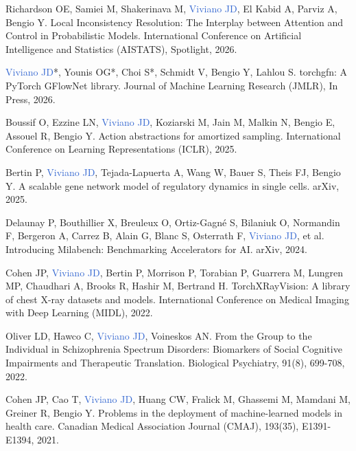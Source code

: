 \documentclass[a4paper,11pt,oneside]{book}
\newcommand\paper[1]{
    #1\\
    \vspace{3.5mm}
}
\begin{document}
\begin{flushleft}
\paper{Richardson OE, Samiei M, Shakerinava M, \textcolor{highlight}{Viviano JD}, El Kabid A, Parviz A, Bengio Y. Local Inconsistency Resolution: The Interplay between Attention and Control in Probabilistic Models. International Conference on Artificial Intelligence and Statistics (AISTATS), Spotlight, 2026.}

\paper{\textcolor{highlight}{Viviano JD}*, Younis OG*, Choi S*, Schmidt V, Bengio Y, Lahlou S. torchgfn: A PyTorch GFlowNet library. Journal of Machine Learning Research (JMLR), In Press, 2026.}

\paper{Boussif O, Ezzine LN, \textcolor{highlight}{Viviano JD}, Koziarski M, Jain M, Malkin N, Bengio E, Assouel R, Bengio Y. Action abstractions for amortized sampling. International Conference on Learning Representations (ICLR), 2025.}

\paper{Bertin P, \textcolor{highlight}{Viviano JD}, Tejada-Lapuerta A, Wang W, Bauer S, Theis FJ, Bengio Y. A scalable gene network model of regulatory dynamics in single cells. arXiv, 2025.}

\paper{Delaunay P, Bouthillier X, Breuleux O, Ortiz-Gagn\'e S, Bilaniuk O, Normandin F, Bergeron A, Carrez B, Alain G, Blanc S, Osterrath F, \textcolor{highlight}{Viviano JD}, et al. Introducing Milabench: Benchmarking Accelerators for AI. arXiv, 2024.}

\paper{Cohen JP, \textcolor{highlight}{Viviano JD}, Bertin P, Morrison P, Torabian P, Guarrera M, Lungren MP, Chaudhari A, Brooks R, Hashir M, Bertrand H. TorchXRayVision: A library of chest X-ray datasets and models. International Conference on Medical Imaging with Deep Learning (MIDL), 2022.}

\paper{Oliver LD, Hawco C, \textcolor{highlight}{Viviano JD}, Voineskos AN. From the Group to the Individual in Schizophrenia Spectrum Disorders: Biomarkers of Social Cognitive Impairments and Therapeutic Translation. Biological Psychiatry, 91(8), 699-708, 2022.}


\paper{Cohen JP, Cao T, \textcolor{highlight}{Viviano JD}, Huang CW, Fralick M, Ghassemi M, Mamdani M, Greiner R, Bengio Y. Problems in the deployment of machine-learned models in health care. Canadian Medical Association Journal (CMAJ), 193(35), E1391-E1394, 2021.}


\end{flushleft}
\end{document}
